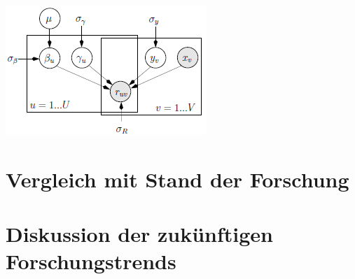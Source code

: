 \documentclass[twosided,a4,10pt]{article}
\begin{document}
\begin{multicols}{2}
		\begin{minipage}{0.45\textwidth}
			\centering
			\includegraphics{img/hybrid.png}
			\label{img:hybrid}
		\end{minipage}
		
		\section{Vergleich mit Stand der Forschung}
		
		\section{Diskussion der zukünftigen Forschungstrends}
		
		
		
		
	\end{multicols}
	
\end{document}

